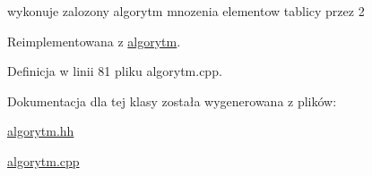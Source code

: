 wykonuje zalozony algorytm mnozenia elementow tablicy przez 2 



\-Reimplementowana z \hyperlink{classalgorytm_aeefdd677ca8b9475a15547dcf8dd461f}{algorytm}.



\-Definicja w linii 81 pliku algorytm.\-cpp.



\-Dokumentacja dla tej klasy została wygenerowana z plików\-:\begin{DoxyCompactItemize}
\item 
\hyperlink{algorytm_8hh}{algorytm.\-hh}\item 
\hyperlink{algorytm_8cpp}{algorytm.\-cpp}\end{DoxyCompactItemize}
